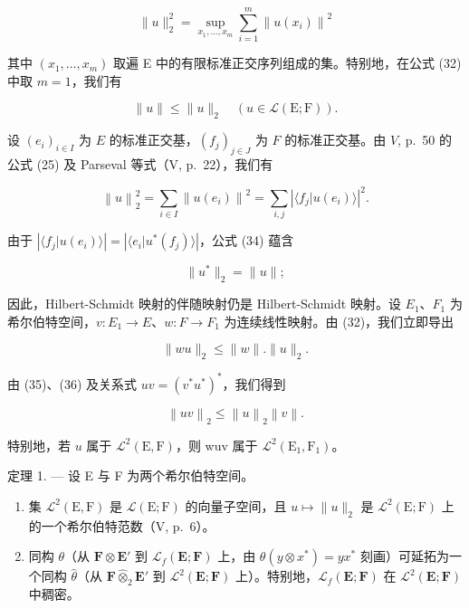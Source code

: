 \[
\| u \| _ {2} ^ {2} = \sup _ {x _ {1}, \dots , x _ {m}} \sum_ {i = 1} ^ {m} \left\| u (x _ {i}) \right\| ^ {2}\tag{32}
\]

其中 \((x_{1},\ldots ,x_{m})\) 取遍 E 中的有限标准正交序列组成的集。特别地，在公式 (32) 中取 \(m = 1\)，我们有

\[
\| u \| \leqslant \| u \| _ {2} \quad (u \in \mathscr {L} (\mathrm{E}; \mathrm{F})).\tag{33}
\]

设 \((e_i)_{i\in I}\) 为 \(E\) 的标准正交基，\((f_j)_{j\in J}\) 为 \(F\) 的标准正交基。由 \(V\), p.~50 的公式 (25) 及 Parseval 等式（V, p.~22），我们有

\[
\left\| u \right\| _ {2} ^ {2} = \sum_ {i \in I} \left\| u (e _ {i}) \right\| ^ {2} = \sum_ {i, j} \left| \langle f _ {j} | u (e _ {i}) \rangle \right| ^ {2}.\tag{34}
\]

由于 \(\left|\langle f_j | u(e_i) \rangle\right| = \left|\langle e_i | u^*(f_j) \rangle\right|\)，公式 (34) 蕴含

\[
\| u ^ {*} \| _ {2} = \| u \|;\tag{35}
\]

因此，Hilbert-Schmidt 映射的伴随映射仍是 Hilbert-Schmidt 映射。设 \(E_{1}\)、\(F_{1}\) 为希尔伯特空间，\(v: E_{1} \to E\)、\(w: F \to F_{1}\) 为连续线性映射。由 (32)，我们立即导出

\[
\| w u \| _ {2} \leqslant \| w \|. \| u \| _ {2}.\tag{36}
\]

由 (35)、(36) 及关系式 \(uv = (v^{*}u^{*})^{*}\)，我们得到

\[
\left\| u v \right\| _ {2} \leqslant \left\| u \right\| _ {2} \left\| v \right\|.\tag{37}
\]

特别地，若 \(u\) 属于 \(\mathcal{L}^2(\mathrm{E},\mathrm{F})\)，则 wuv 属于 \(\mathcal{L}^2(\mathrm{E}_1,\mathrm{F}_1)\)。

定理 1. --- 设 E 与 F 为两个希尔伯特空间。

\begin{enumerate}
\def\labelenumi{(\roman{enumi})}
\item
  集 \(\mathcal{L}^2 (\mathrm{E},\mathrm{F})\) 是 \(\mathcal{L}(\mathrm{E};\mathrm{F})\) 的向量子空间，且 \(u\mapsto \| u\| _2\) 是 \(\mathcal{L}^2 (\mathrm{E};\mathrm{F})\) 上的一个希尔伯特范数（V, p.~6）。
\item
  同构 \(\theta\)（从 \(\mathbf{F} \otimes \mathbf{E}'\) 到 \(\mathcal{L}_f(\mathbf{E};\mathbf{F})\) 上，由 \(\theta(y \otimes x^*) = yx^*\) 刻画）可延拓为一个同构 \(\hat{\theta}\)（从 \(\mathbf{F} \hat{\otimes}_2 \mathbf{E}'\) 到 \(\mathcal{L}^2(\mathbf{E};\mathbf{F})\) 上）。特别地，\(\mathcal{L}_f(\mathbf{E};\mathbf{F})\) 在 \(\mathcal{L}^2(\mathbf{E};\mathbf{F})\) 中稠密。
\end{enumerate}

